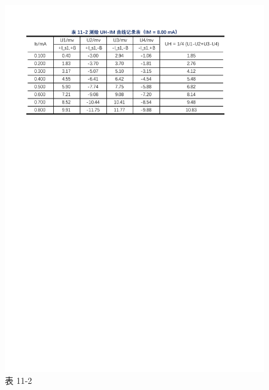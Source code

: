 \documentclass[12pt]{article}
\begin{document}
\begin{figure}[H] %
    \centering
    \includegraphics[width=\textwidth]{./figures/表11-2.pdf} 
    \caption{表 11-2}
    \label{fig:table_data2}
\end{figure}
\end{document}
